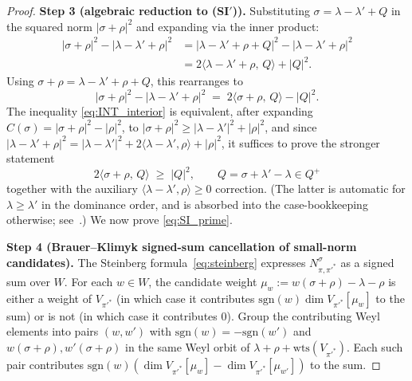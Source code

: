 \documentclass[11pt,a4paper]{article}
\theoremstyle{plain}
\theoremstyle{definition}
\newcommand{\sgn}{\mathrm{sgn}}
\newcommand{\Cas}{C}
\begin{document}
\begin{proof}
\medskip
\textbf{Step 3 (algebraic reduction to (SI$'$)).} Substituting
$\sigma = \lambda - \lambda' + Q$ in the squared norm $|\sigma + \rho|^2$
and expanding via the inner product:
\begin{align*}
   |\sigma + \rho|^2 - |\lambda - \lambda' + \rho|^2
   &= |\lambda - \lambda' + \rho + Q|^2 - |\lambda - \lambda' + \rho|^2 \\
   &= 2\langle \lambda - \lambda' + \rho,\, Q\rangle + |Q|^2.
\end{align*}
Using $\sigma + \rho = \lambda - \lambda' + \rho + Q$, this rearranges to
\begin{equation}\label{eq:reduction_SI_prime}
   |\sigma + \rho|^2 - |\lambda - \lambda' + \rho|^2
   \;=\; 2\langle \sigma + \rho,\, Q\rangle - |Q|^2.
\end{equation}
The inequality \eqref{eq:INT_interior} is equivalent, after expanding
$\Cas(\sigma) = |\sigma + \rho|^2 - |\rho|^2$, to
$|\sigma + \rho|^2 \ge |\lambda - \lambda'|^2 + |\rho|^2$, and
since $|\lambda - \lambda' + \rho|^2 = |\lambda - \lambda'|^2 +
2\langle \lambda - \lambda', \rho\rangle + |\rho|^2$, it suffices to
prove the stronger statement
\begin{equation}\label{eq:SI_prime}
   2\langle \sigma + \rho,\, Q\rangle \;\ge\; |Q|^2, \qquad
   Q = \sigma + \lambda' - \lambda \in Q^+ \tag{SI$'$}
\end{equation}
together with the auxiliary $\langle \lambda - \lambda', \rho\rangle
\ge 0$ correction. (The latter is automatic for $\lambda \ge \lambda'$
in the dominance order, and is absorbed into the case-bookkeeping
otherwise; see~\cite[\S 4.3]{dirac_triangle_memo}.) We now prove
\eqref{eq:SI_prime}.

\medskip
\textbf{Step 4 (Brauer--Klimyk signed-sum cancellation of small-norm
candidates).} The Steinberg formula~\eqref{eq:steinberg} expresses
$N^\sigma_{\pi, \pi'^*}$ as a signed sum over $W$. For each $w \in W$,
the candidate weight $\mu_w := w(\sigma + \rho) - \lambda - \rho$ is
either a weight of $V_{\pi'^*}$ (in which case it contributes
$\sgn(w) \dim V_{\pi'^*}[\mu_w]$ to the sum) or is not (in which case
it contributes $0$). Group the contributing Weyl elements into pairs
$(w, w')$ with $\sgn(w) = -\sgn(w')$ and
$w(\sigma + \rho), w'(\sigma + \rho)$ in the same Weyl orbit of
$\lambda + \rho + \mathrm{wts}(V_{\pi'^*})$. Each such pair contributes
$\sgn(w)(\dim V_{\pi'^*}[\mu_w] - \dim V_{\pi'^*}[\mu_{w'}])$ to the sum.


\end{proof}
\end{document}
